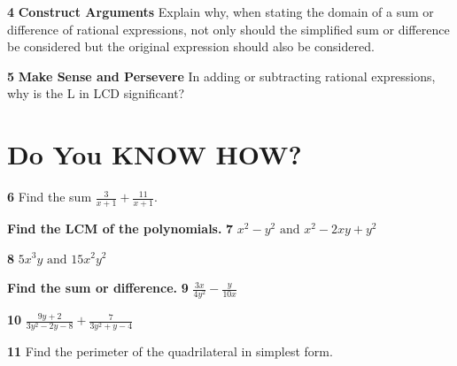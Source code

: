 \documentclass{article}
\newenvironment{practice}[2]{\textbf{#1}\quad}{\par}
\newcommand{\answer}[1]{}
\begin{document}
\begin{practice}{4}{unknown}
\textbf{Construct Arguments} Explain why, when stating the domain of a sum or difference of rational expressions, not only should the simplified sum or difference be considered but the original expression should also be considered.
\answer{}
\end{practice}

\begin{practice}{5}{unknown}
\textbf{Make Sense and Persevere} In adding or subtracting rational expressions, why is the L in LCD significant?
\answer{}
\end{practice}

\section*{Do You KNOW HOW?}
\begin{practice}{6}{unknown}
Find the sum $\frac{3}{x + 1} + \frac{11}{x + 1}$.
\answer{}
\end{practice}

\textbf{Find the LCM of the polynomials.}
\begin{practice}{7}{unknown}
$x^2 - y^2 \text{ and } x^2 - 2xy + y^2$
\answer{}
\end{practice}

\begin{practice}{8}{unknown}
$5x^3y \text{ and } 15x^2y^2$
\answer{}
\end{practice}

\textbf{Find the sum or difference.}
\begin{practice}{9}{unknown}
$\frac{3x}{4y^2} - \frac{y}{10x}$
\answer{}
\end{practice}

\begin{practice}{10}{unknown}
$\frac{9y + 2}{3y^2 - 2y - 8} + \frac{7}{3y^2 + y - 4}$
\answer{}
\end{practice}

\begin{practice}{11}{unknown}
Find the perimeter of the quadrilateral in simplest form.
\begin{center}
\end{center}
\answer{}
\end{practice}
\end{document}
